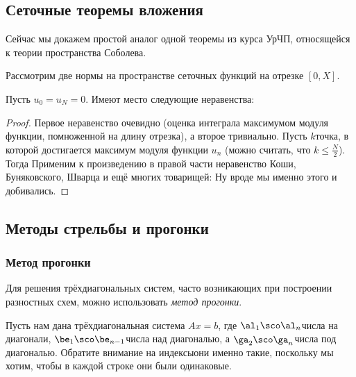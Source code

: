 \documentclass[a4paper]{article}
\begin{document}
\subsection{Сеточные теоремы вложения}

Сейчас мы докажем простой аналог одной теоремы из курса УрЧП, относящейся к теории пространства Соболева.

Рассмотрим две нормы на пространстве сеточных функций на отрезке $[0,X]$.

\begin{theorem}[вложения] Пусть $u_0 = u_N = 0$. Имеют место следующие неравенства:
\end{theorem}
\begin{proof}
Первое неравенство очевидно (оценка интеграла максимумом модуля функции, помноженной на длину отрезка),
а второе тривиально. Пусть $k$\т точка, в которой достигается максимум модуля функции $u_n$
(можно считать, что $k \le \frac N2$).
Тогда
Применим к произведению в правой части неравенство Коши, Буняковского, Шварца и ещё многих товарищей:
Ну вроде мы именно этого и добивались.
\end{proof}

\subsection{Методы стрельбы и прогонки}

\subsubsection{Метод прогонки}

Для решения трёхдиагональных систем, часто возникающих при построении разностных схем, можно использовать \emph{метод прогонки}.

Пусть нам дана трёхдиагональная система $Ax=b$, где $\al_1\sco \al_n$\т числа на диагонали,
$\be_1\sco\be_{n-1}$\т числа над диагональю, а $\ga_2\sco\ga_{n}$\т числа под диагональю. Обратите внимание
на индексы\т они именно такие, поскольку мы хотим, чтобы в каждой строке они были одинаковые.
\end{document}
